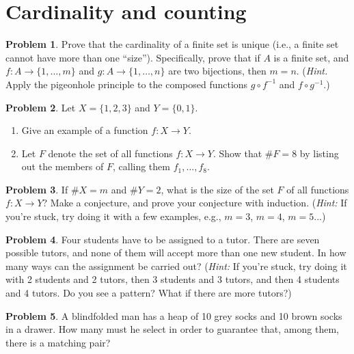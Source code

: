 \documentclass{article}
\numberwithin{equation}{section}
\theoremstyle{plain}
\theoremstyle{definition}
\newtheorem{problem}{Problem}
\begin{document}
\section*{Cardinality and counting}

\begin{problem}
	Prove that the cardinality of a finite set is unique (i.e., a finite set cannot have more than one ``size''). Specifically, prove that if $A$ is a finite set, and $f : A \to \{1,\ldots, m\}$ and $g : A \to \{1, \ldots, n\}$ are two bijections, then $m = n$. (\emph{Hint.} Apply the pigeonhole principle to the composed functions $g \circ f^{-1}$ and $f \circ g^{-1}$.)
\end{problem}

\begin{problem}
	Let $X = \{1,2,3\}$ and $Y = \{0,1\}$. 
	\begin{enumerate}[label=(\alph*)]
		\item Give an example of a function $f : X \to Y$. 
		\item Let $F$ denote the set of all functions $f : X \to Y$. Show that $\#F = 8$ by listing out the members of $F$, calling them $f_1, \ldots, f_8$. 
	\end{enumerate}
\end{problem}

\begin{problem}
	If $\#X = m$ and $\#Y = 2$, what is the size of the set $F$ of all functions $f : X \to Y$? Make a conjecture, and prove your conjecture with induction. (\emph{Hint:} If you're stuck, try doing it with a few examples, e.g., $m = 3$, $m = 4$, $m=5$...)
\end{problem}

\begin{problem}
	Four students have to be assigned to a tutor. There are seven possible tutors, and none of them will accept more than one new student. In how many ways can the assignment be carried out? (\emph{Hint:} If you're stuck, try doing it with 2 students and 2 tutors, then 3 students and 3 tutors, and then 4 students and 4 tutors. Do you see a pattern? What if there are more tutors?)
\end{problem}

\begin{problem}
	A blindfolded man has a heap of 10 grey socks and 10 brown socks in a drawer. How many must he select in order to guarantee that, among them, there is a matching pair?
\end{problem}
\end{document}
